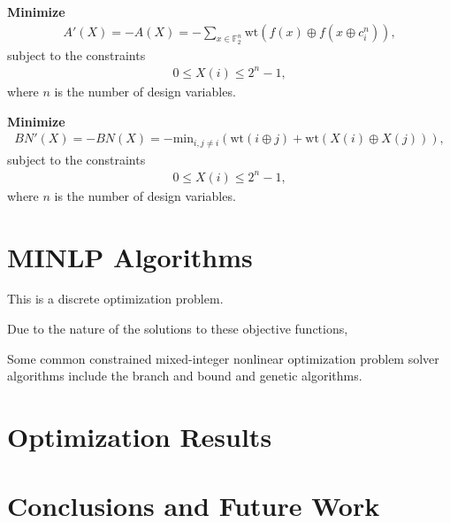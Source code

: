 \documentclass[11pt]{article}
\newcommand{\field}[1]{\mathbb{#1}} %
\begin{document}
\textbf{Minimize}
\begin{eqnarray*}
A'(X) = -A(X) = -\sum_{x \in \field{F}_2^n} \text{wt}(f(x) \oplus f(x \oplus c_{i}^{n})),
\end{eqnarray*}
subject to the constraints
\begin{eqnarray*}
0 \leq X(i) \leq 2^{n} - 1,
\end{eqnarray*}
where $n$ is the number of design variables.

\textbf{Minimize}
\begin{eqnarray*}
BN'(X) = -BN(X) = -\text{min}_{i, j\not=i}(\text{wt}(i \oplus j) + \text{wt}(X(i) \oplus X(j))),
\end{eqnarray*}
subject to the constraints
\begin{eqnarray*}
0 \leq X(i) \leq 2^{n} - 1,
\end{eqnarray*}
where $n$ is the number of design variables.

\section{MINLP Algorithms}

This is a discrete optimization problem. 

Due to the nature of the solutions to these objective functions, 

Some common constrained mixed-integer nonlinear optimization problem solver algorithms include the branch and bound and genetic algorithms. 

\section{Optimization Results}

\section{Conclusions and Future Work}
\end{document}
